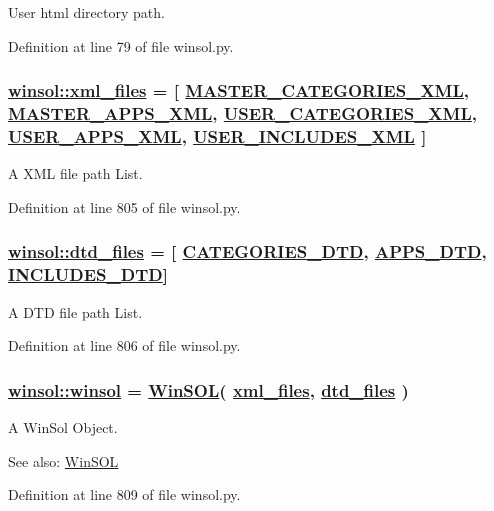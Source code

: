 User html directory path. 



Definition at line 79 of file winsol.py.\hypertarget{namespacewinsol_e85bfaa286fd710182b7d906a514c2ea}{
\subsubsection[xml\_\-files]{\setlength{\rightskip}{0pt plus 5cm}\hyperlink{namespacewinsol_e85bfaa286fd710182b7d906a514c2ea}{winsol::xml\_\-files} = \mbox{[} \hyperlink{namespacewinsol_3af9670786db792ef5991af5c3ae5793}{MASTER\_\-CATEGORIES\_\-XML}, \hyperlink{namespacewinsol_a0bf1d73390881ffdffdc95bee515f38}{MASTER\_\-APPS\_\-XML}, \hyperlink{namespacewinsol_329896e2d91a81d585750db3b5019e3a}{USER\_\-CATEGORIES\_\-XML}, \hyperlink{namespacewinsol_c33a1cb562b690cab5c72abf5dc6889a}{USER\_\-APPS\_\-XML}, \hyperlink{namespacewinsol_f5b54eec64d2e3ce6c6b15a1fbc615dd}{USER\_\-INCLUDES\_\-XML} \mbox{]}}}
\label{namespacewinsol_e85bfaa286fd710182b7d906a514c2ea}


A XML file path List. 



Definition at line 805 of file winsol.py.\hypertarget{namespacewinsol_3bdf23ecc07b0e9a9d7f680ae9c2cb6f}{
\subsubsection[dtd\_\-files]{\setlength{\rightskip}{0pt plus 5cm}\hyperlink{namespacewinsol_3bdf23ecc07b0e9a9d7f680ae9c2cb6f}{winsol::dtd\_\-files} = \mbox{[} \hyperlink{namespacewinsol_75406b2652e6bf9dc6b9566a0cb0e517}{CATEGORIES\_\-DTD}, \hyperlink{namespacewinsol_de0a178fcabafce978c245668b647015}{APPS\_\-DTD}, \hyperlink{namespacewinsol_9a613f23f40b0893b5d130ccfc1a899e}{INCLUDES\_\-DTD}\mbox{]}}}
\label{namespacewinsol_3bdf23ecc07b0e9a9d7f680ae9c2cb6f}


A DTD file path List. 



Definition at line 806 of file winsol.py.\hypertarget{namespacewinsol_624e4bca2810b741068d3494a5a7612d}{
\subsubsection[winsol]{\setlength{\rightskip}{0pt plus 5cm}\hyperlink{namespacewinsol_624e4bca2810b741068d3494a5a7612d}{winsol::winsol} = \hyperlink{classwinsol_1_1WinSOL}{Win\-SOL}( \hyperlink{namespacewinsol_e85bfaa286fd710182b7d906a514c2ea}{xml\_\-files}, \hyperlink{namespacewinsol_3bdf23ecc07b0e9a9d7f680ae9c2cb6f}{dtd\_\-files} )}}
\label{namespacewinsol_624e4bca2810b741068d3494a5a7612d}


A Win\-Sol Object. 

\begin{Desc}
\item[See also:]\hyperlink{classwinsol_1_1WinSOL}{Win\-SOL} \end{Desc}


Definition at line 809 of file winsol.py.